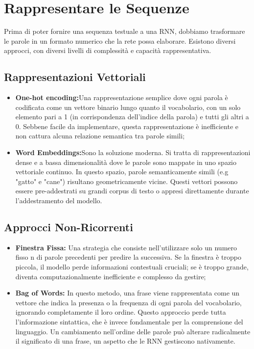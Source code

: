 \section{Rappresentare le Sequenze}
Prima di poter fornire una sequenza testuale a una RNN, dobbiamo trasformare le parole in un formato numerico che la rete possa elaborare. Esistono diversi approcci, con diversi livelli di complessità e capacità rappresentativa.
\subsection{Rappresentazioni Vettoriali}
\begin{itemize}
    \item \textbf{One-hot encoding:}Una rappresentazione semplice dove ogni parola è codificata come un vettore binario lungo quanto il vocabolario, con un solo elemento pari a 1 (in corrispondenza dell'indice della parola) e tutti gli altri a 0. Sebbene facile da implementare, questa rappresentazione è inefficiente e non cattura alcuna relazione semantica tra parole simili;
    \item \textbf{Word Embeddings:}Sono la soluzione moderna. Si tratta di rappresentazioni dense e a bassa dimensionalità dove le parole sono mappate in uno spazio vettoriale continuo. In questo spazio, parole semanticamente simili (e.g "gatto" e "cane") risultano geometricamente vicine. Questi vettori possono essere pre-addestrati su grandi corpus di testo o appresi direttamente durante l'addestramento del modello.
\end{itemize}
\subsection{Approcci Non-Ricorrenti}
\begin{itemize}
    \item \textbf{Finestra Fissa:} Una strategia che consiste nell'utilizzare solo un numero fisso n di parole precedenti per predire la successiva. Se la finestra è troppo piccola, il modello perde informazioni contestuali cruciali; se è troppo grande, diventa computazionalmente inefficiente e complesso da gestire;
    \item \textbf{Bag of Words:} In questo metodo, una frase viene rappresentata come un vettore che indica la presenza o la frequenza di ogni parola del vocabolario, ignorando completamente il loro ordine. Questo approccio perde tutta l'informazione sintattica, che è invece fondamentale per la comprensione del linguaggio. Un cambiamento nell'ordine delle parole può alterare radicalmente il significato di una frase, un aspetto che le RNN gestiscono nativamente.
\end{itemize}

